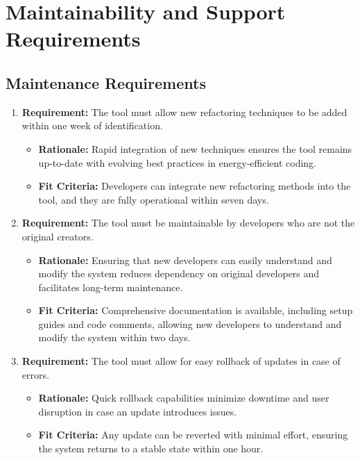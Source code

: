 \documentclass[12pt]{article}
\begin{document}
\section{Maintainability and Support Requirements}
\subsection{Maintenance Requirements}
\begin{enumerate}
  \item \textbf{Requirement:} The tool must allow new refactoring techniques to be added within one week of identification.
     \begin{itemize}
         \item \textbf{Rationale:} Rapid integration of new techniques ensures the tool remains up-to-date with evolving best practices in energy-efficient coding.
         \item \textbf{Fit Criteria:} Developers can integrate new refactoring methods into the tool, and they are fully operational within seven days.
     \end{itemize}
     
  \item \textbf{Requirement:} The tool must be maintainable by developers who are not the original creators.
     \begin{itemize}
         \item \textbf{Rationale:} Ensuring that new developers can easily understand and modify the system reduces dependency on original developers and facilitates long-term maintenance.
         \item \textbf{Fit Criteria:} Comprehensive documentation is available, including setup guides and code comments, allowing new developers to understand and modify the system within two days.
     \end{itemize}
     
  \item \textbf{Requirement:} The tool must allow for easy rollback of updates in case of errors.
     \begin{itemize}
         \item \textbf{Rationale:} Quick rollback capabilities minimize downtime and user disruption in case an update introduces issues.
         \item \textbf{Fit Criteria:} Any update can be reverted with minimal effort, ensuring the system returns to a stable state within one hour.
     \end{itemize}
     

\end{enumerate}
\end{document}
